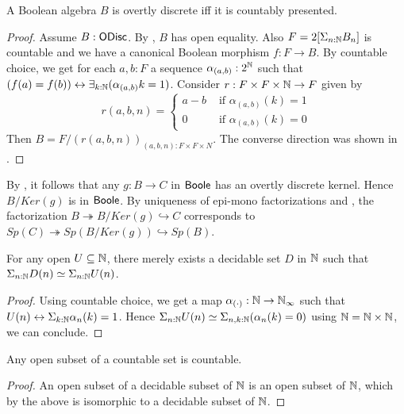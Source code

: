\begin{corollary}\label{ODiscBAareBoole}
  A Boolean algebra $B$ is overtly discrete iff it is countably presented. 
\end{corollary}
\begin{proof}
  Assume $B:\mathsf{ODisc}$. 
  By , $B$ has open equality. 
  Also $F = 2[\Sigma_{n:\mathbb{N}}B_n]$ is countable and we have a canonical 
  Boolean morphism $f:F \to B$. 
  By countable choice, we get for each $a,b:F$
  a sequence $\alpha_{(a,b)}:2^{\mathbb{N}}$ such that 
  $(f(a) = f(b))\leftrightarrow \exists_{k:\mathbb{N}} (\alpha_{(a,b)}k =1)$. 
  Consider 
  $r:F \times F \times \mathbb{N} \to F$ 
  given by 
  $$r(a,b,n) =\begin{cases}
    a-b &\text{ if } \alpha_{(a,b)}(k) = 1\\
    0   &\text{ if } \alpha_{(a,b)}(k) = 0
  \end{cases}
  $$
  Then $B= F/(r (a,b,n))_{(a,b,n): F \times F \times N}$. 
  The converse direction was shown in .
\end{proof}
\begin{remark}\label{BooleEpiMono}
  By , it follows that any 
  $g:B\to C$ in $\mathsf{Boole}$ has an overtly discrete kernel.
  Hence $B/Ker(g)$ is in $\mathsf{Boole}$. 
  By uniqueness of epi-mono factorizations and , 
  the factorization 
  $B\twoheadrightarrow B/Ker(g) \hookrightarrow C$ corresponds to 
  $Sp(C) \twoheadrightarrow Sp(B/Ker(g)) \hookrightarrow Sp(B)$. 
\end{remark}

\begin{lemma}\label{OpenInNAreDecidableInN}
For any open $U\subseteq \mathbb{N}$, there merely exists a decidable set $D$ in $\mathbb{N}$ such that 
$\Sigma_{n:\mathbb{N}} D(n) \simeq \Sigma_{n:\mathbb{N}} U(n)$.
\end{lemma}
\begin{proof}
  Using countable choice, we get a map $\alpha_{(\cdot)}: \mathbb{N} \to \mathbb{N}_{\infty}$ such that 
  $U(n) \leftrightarrow \Sigma_{k:\mathbb{N}} \alpha_n(k) = 1$. Hence 
  $\Sigma_{n:\mathbb{N}}U(n) \simeq \Sigma_{n,k:\mathbb{N}}(\alpha_n(k)=0)$
  using $\mathbb{N}=\mathbb{N}\times\mathbb{N}$, we can conclude. 
\end{proof}
\begin{corollary}
  Any open subset of a countable set is countable. 
\end{corollary}
\begin{proof}
  An open subset of a decidable subset of $\mathbb{N}$ is an open subset of $\mathbb{N}$, 
  which by the above is isomorphic to a decidable subset of $\mathbb{N}$. 
\end{proof}





